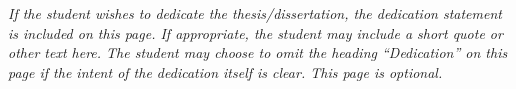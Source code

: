 
\begingroup \Centering
\vspace*{\fill}
\vspace{-5\baselineskip}
\textit{If the student wishes to dedicate the thesis/dissertation, the dedication
statement is included on this page. If appropriate, the student may include
a short quote or other text here. The student may choose to omit the heading
“Dedication” on this page if the intent of the dedication itself is clear.
This page is optional.}
\vspace*{\fill}
\endgroup

